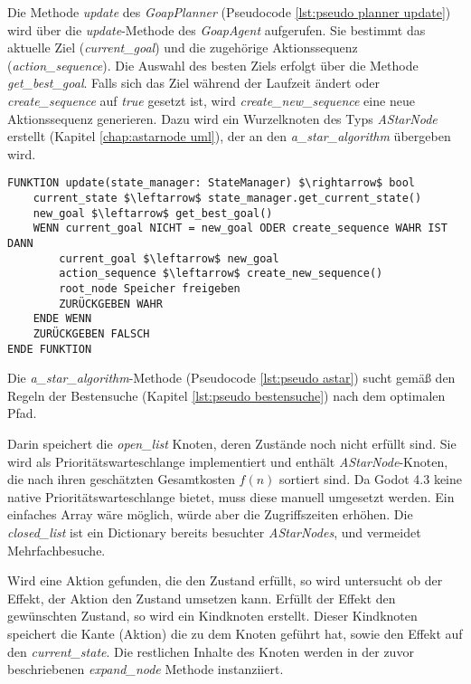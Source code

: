 Die Methode \textit{update} des \textit{GoapPlanner} (Pseudocode \ref{lst:pseudo planner update}) wird über die \textit{update}-Methode des \textit{GoapAgent} aufgerufen. Sie bestimmt das aktuelle Ziel (\textit{current_goal}) und die zugehörige Aktionssequenz (\textit{action_sequence}). Die Auswahl des besten Ziels erfolgt über die Methode \textit{get_best_goal}. Falls sich das Ziel während der Laufzeit ändert oder \textit{create_sequence} auf \textit{true} gesetzt ist, wird \textit{create_new_sequence} eine neue Aktionssequenz generieren. Dazu wird ein Wurzelknoten des Typs \textit{AStarNode} erstellt (Kapitel \ref{chap:astarnode uml}), der an den \textit{a_star_algorithm} übergeben wird.


\begin{lstlisting}[language=Pseudo, caption={update Methode des GoapAgent}, mathescape=true, label={lst:pseudo planner update}]
FUNKTION update(state_manager: StateManager) $\rightarrow$ bool
    current_state $\leftarrow$ state_manager.get_current_state()
    new_goal $\leftarrow$ get_best_goal()
    WENN current_goal NICHT = new_goal ODER create_sequence WAHR IST DANN
        current_goal $\leftarrow$ new_goal
        action_sequence $\leftarrow$ create_new_sequence()
        root_node Speicher freigeben
        ZURÜCKGEBEN WAHR
    ENDE WENN
    ZURÜCKGEBEN FALSCH
ENDE FUNKTION
\end{lstlisting}

Die \textit{a_star_algorithm}-Methode (Pseudocode \ref{lst:pseudo astar}) sucht gemäß den Regeln der Bestensuche (Kapitel \ref{lst:pseudo bestensuche}) nach dem optimalen Pfad.

Darin speichert die \textit{open_list} Knoten, deren Zustände noch nicht erfüllt sind. Sie wird als Prioritätswarteschlange implementiert und enthält \textit{AStarNode}-Knoten, die nach ihren geschätzten Gesamtkosten $f(n)$ sortiert sind. Da Godot 4.3 keine native Prioritätswarteschlange bietet, muss diese manuell umgesetzt werden. Ein einfaches Array wäre möglich, würde aber die Zugriffszeiten erhöhen. Die \textit{closed\_list} ist ein Dictionary bereits besuchter \textit{AStarNodes}, und vermeidet Mehrfachbesuche.

Wird eine Aktion gefunden, die den Zustand erfüllt, so wird untersucht ob der Effekt, der Aktion den Zustand umsetzen kann. Erfüllt der Effekt den gewünschten Zustand, so wird ein Kindknoten erstellt. Dieser Kindknoten speichert die Kante (Aktion) die zu dem Knoten geführt hat, sowie den Effekt auf den \textit{current\_state}. Die restlichen Inhalte des Knoten werden in der zuvor beschriebenen \textit{expand\_node} Methode instanziiert.

